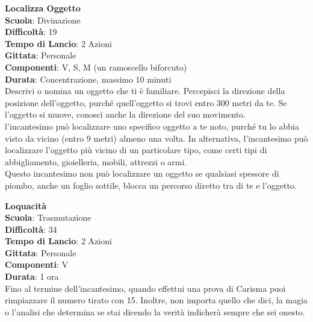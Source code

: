 \begin{multicols}{2}
\medskip\textbf{Localizza Oggetto}\\
\textbf{Scuola}: Divinazione\\
\textbf{Difficoltà}: 19\\
\textbf{Tempo di Lancio}: 2 Azioni\\
\textbf{Gittata}: Personale\\
\textbf{Componenti}: V, S, M (un ramoscello biforcuto)\\
\textbf{Durata}: Concentrazione, massimo 10 minuti \\
Descrivi o nomina un oggetto che ti è familiare. Percepisci la direzione della posizione dell'oggetto, purché quell'oggetto si trovi entro 300 metri da te. Se l'oggetto si muove, conosci anche la direzione del suo movimento.\\
l'incantesimo può localizzare uno specifico oggetto a te noto, purché tu lo abbia visto da vicino (entro 9 metri) almeno una volta. In alternativa, l'incantesimo può localizzare l'oggetto più vicino di un particolare tipo, come certi tipi di abbigliamento, gioielleria, mobili, attrezzi o armi.\\
Questo incantesimo non può localizzare un oggetto se qualsiasi spessore di piombo, anche un foglio sottile, blocca un percorso diretto tra di te e l'oggetto. 

\medskip\textbf{Loquacità}\\
\textbf{Scuola}: Trasmutazione\\
\textbf{Difficoltà}: 34\\
\textbf{Tempo di Lancio}: 2 Azioni\\
\textbf{Gittata}: Personale\\
\textbf{Componenti}: V\\
\textbf{Durata}: 1 ora\\
Fino al termine dell'incantesimo, quando effettui una prova di Carisma puoi rimpiazzare il numero tirato con 15. Inoltre, non importa quello che dici, la magia o l'analisi che determina se stai dicendo la verità indicherà sempre che sei onesto.


\end{multicols}
